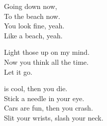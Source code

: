 Going down now, \\
To the beach now. \\
You look fine, yeah. \\
Like a beach, yeah. \\




Light those up on my mind. \\
Now you think all the time. \\

Let it go. \\




 is cool, then you die. \\
Stick a needle in your eye. \\
Cars are fun, then you crash. \\
Slit your wrists, slash your neck. \\
